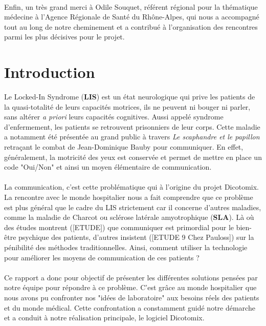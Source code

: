 \documentclass[11pt,a4paper]{article}
\theoremstyle{plain}
\theoremstyle{definition}
\begin{document}
\paragraph{}Enfin, un très grand merci à Odile Souquet, référent régional pour la thématique médecine à l'Agence Régionale de Santé du Rhône-Alpes, qui nous a accompagné tout 
au long de notre cheminement et a contribué à l'organisation des rencontres parmi les plus décisives pour le projet.

\newpage

\tableofcontents

\newpage
\section{Introduction}

Le Locked-In Syndrome (\textbf{LIS}) est un état neurologique qui prive les patients de la quasi-totalité de leurs capacités motrices, ils ne peuvent ni bouger ni parler,
sans altérer \textit{a priori} leurs capacités cognitives. Aussi appelé syndrome d'enfermement, les patients se retrouvent prisonniers de leur corps.
Cette maladie a notamment été présentée au grand public à travers \textit{Le scaphandre et le papillon} retraçant le combat de Jean-Dominique Bauby pour communiquer. 
En effet, généralement, la motricité des yeux est conservée et permet de mettre en place un code "Oui/Non" et ainsi un moyen élémentaire de communication.

\paragraph{} La communication, c'est cette problématique qui à l'origine du projet Dicotomix. La rencontre avec le monde hospitalier nous a fait comprendre que ce problème est plus général 
que le cadre du LIS strictement car il concerne d'autres maladies, comme la maladie de Charcot ou sclérose latérale amyotrophique (\textbf{SLA}). Là où des études montrent ([ETUDE]) que communiquer est primordial pour le bien-être psychique des patients, d'autres insistent ([ETUDE 9 Chez Pauloss]) sur la pénibilité des méthodes traditionnelles. Ainsi, comment utiliser la technologie pour améliorer les moyens de communication de ces patients ? 

\paragraph{} Ce rapport a donc pour objectif de présenter les différentes solutions pensées par notre équipe pour répondre à ce problème. C'est grâce au monde hospitalier que 
nous avons pu confronter nos "idées de laboratoire" aux besoins réels des patients et du monde médical. Cette confrontation a constamment guidé notre démarche et a conduit à notre
réalisation principale, le logiciel Dicotomix.
\end{document}
